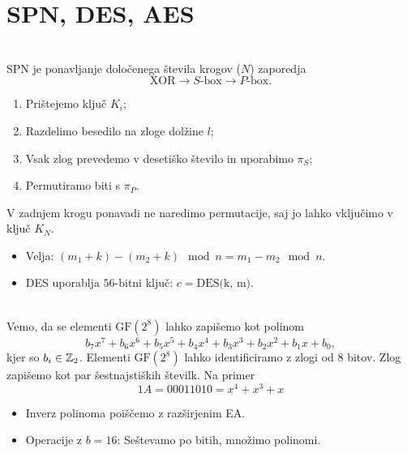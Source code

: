 \section{SPN, DES, AES}
\\
SPN je ponavljanje določenega števila krogov (\(N\)) zaporedja
\[
    \text{XOR} \to S\text{-box} \to P\text{-box}.
\]
\begin{enumerate}
    \item Prištejemo ključ \(K_i\);
    \item Razdelimo besedilo na zloge dolžine \(l\);
    \item Vsak zlog prevedemo v desetiško število in uporabimo \(\pi_S\);
    \item Permutiramo biti s \(\pi_P\).
\end{enumerate}
V zadnjem krogu ponavadi ne naredimo permutacije, saj jo lahko vključimo v ključ \(K_N\).\\
\begin{itemize}
    \item Velja: \((m_1 + k) - (m_2 + k) \mod n = m_1 - m_2 \mod n\).
    \item DES uporablja \(56\)-bitni ključ: \(c = \text{DES(k, m)}\).
\end{itemize}
\\
Vemo, da se elementi \(\text{GF}(2^8)\) lahko zapišemo kot polinom 
\[
    b_7x^7 + b_6x^6 + b_5x^5 +b_4x^4 +b_3x^3 +b_2x^2 +b_1x + b_0,
\]
kjer so \(b_i \in \mathbb{Z}_2\). Elementi \(\text{GF}(2^8)\) lahko identificiramo z zlogi od 8 bitov. Zlog zapišemo kot par šestnajstiških številk. Na primer
\[
1A = 00011010 = x^4 + x^3 + x
\]
\begin{itemize}
    \item Inverz polinoma poiščemo z razširjenim EA.
    \item Operacije z \(b = 16\): Seštevamo po bitih, množimo polinomi.
\end{itemize}
